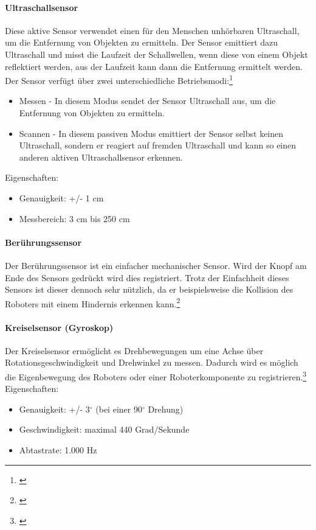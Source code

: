 \paragraph{Ultraschallsensor}
\color{finishing}
Diese aktive Sensor verwendet einen für den Menschen unhörbaren Ultraschall, um die Entfernung von Objekten zu ermitteln. Der Sensor emittiert dazu Ultraschall und misst die Laufzeit der Schallwellen, wenn diese von einem Objekt reflektiert werden, aus der Laufzeit kann dann die Entfernung ermittelt werden. Der Sensor verfügt über zwei unterschiedliche Betriebsmodi:\footnote{\citep[vgl.][Das EV3 Roboter Universum, Seite 32 f.]{Scholz.DasEV3}\label{note30}}
\begin{itemize}
	\item{Messen} - In diesem Modus sendet der Sensor Ultraschall aus, um die Entfernung von Objekten zu ermitteln.
	\item{Scannen} - In diesem passiven Modus emittiert der Sensor selbst keinen Ultraschall, sondern er reagiert auf fremden Ultraschall und kann so einen anderen aktiven Ultraschallsensor erkennen.
\end{itemize}
\smallskip
Eigenschaften:
\begin{itemize}
	\item{Genauigkeit: +/- 1 cm}
	\item{Messbereich: 3 cm bis 250 cm}
\end{itemize}
\paragraph{Berührungssensor}
\color{finishing}
Der Berührungssensor ist ein einfacher mechanischer Sensor. Wird der Knopf am Ende des Sensors gedrückt wird dies registriert. Trotz der Einfachheit dieses Sensors ist dieser dennoch sehr nützlich, da er beispielsweise die Kollision des Roboters mit einem Hindernis erkennen kann.\footnote{\citep[vgl.][Das EV3 Roboter Universum, Seite 33]{Scholz.DasEV3}\label{note31}}
\paragraph{Kreiselsensor (Gyroskop)}
\color{finishing}
Der Kreiselsensor ermöglicht es Drehbewegungen um eine Achse über Rotationsgeschwindigkeit und Drehwinkel zu messen. Dadurch wird es möglich die Eigenbewegung des Roboters oder einer Roboterkomponente zu registrieren.\footnote{\citep[vgl.][Das EV3 Roboter Universum, Seite 33]{Scholz.DasEV3}\label{note32}}
\medskip
\newline
Eigenschaften:
\begin{itemize}
	\item{Genauigkeit: +/- 3$^\circ$ (bei einer 90$^\circ$ Drehung)}
	\item{Geschwindigkeit: maximal 440 Grad/Sekunde}
	\item{Abtastrate: 1.000 Hz}
\end{itemize}
